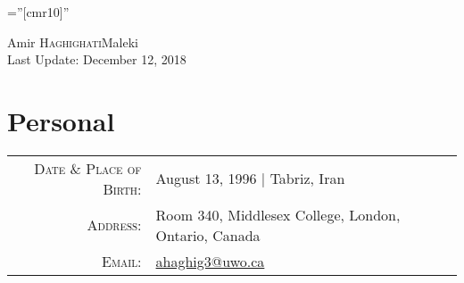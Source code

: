 \documentclass[a4paper,10pt]{article}
\begin{document}
\font\fb=''[cmr10]'' %

\par{\centering
		{\Huge Amir \textsc{Haghighati}Maleki\\
		\small{Last Update: December 12, 2018}
		}
	\bigskip\par
}
\section{Personal}

\begin{tabular}{rl}
    \textsc{Date \& Place of Birth:} & August 13, 1996 | Tabriz, Iran \\
    \textsc{Address:}   & Room 340, Middlesex College, London, Ontario, Canada \\
    \textsc{Email:}     & \href{mailto:ahaghig3@uwo.ca}{ahaghig3@uwo.ca} \\
\end{tabular}

\end{document}
